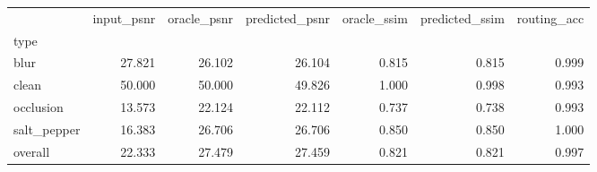 \begin{tabular}{lrrrrrr}
\toprule
 & input_psnr & oracle_psnr & predicted_psnr & oracle_ssim & predicted_ssim & routing_acc \\
type &  &  &  &  &  &  \\
\midrule
blur & 27.821 & 26.102 & 26.104 & 0.815 & 0.815 & 0.999 \\
clean & 50.000 & 50.000 & 49.826 & 1.000 & 0.998 & 0.993 \\
occlusion & 13.573 & 22.124 & 22.112 & 0.737 & 0.738 & 0.993 \\
salt_pepper & 16.383 & 26.706 & 26.706 & 0.850 & 0.850 & 1.000 \\
overall & 22.333 & 27.479 & 27.459 & 0.821 & 0.821 & 0.997 \\
\bottomrule
\end{tabular}
